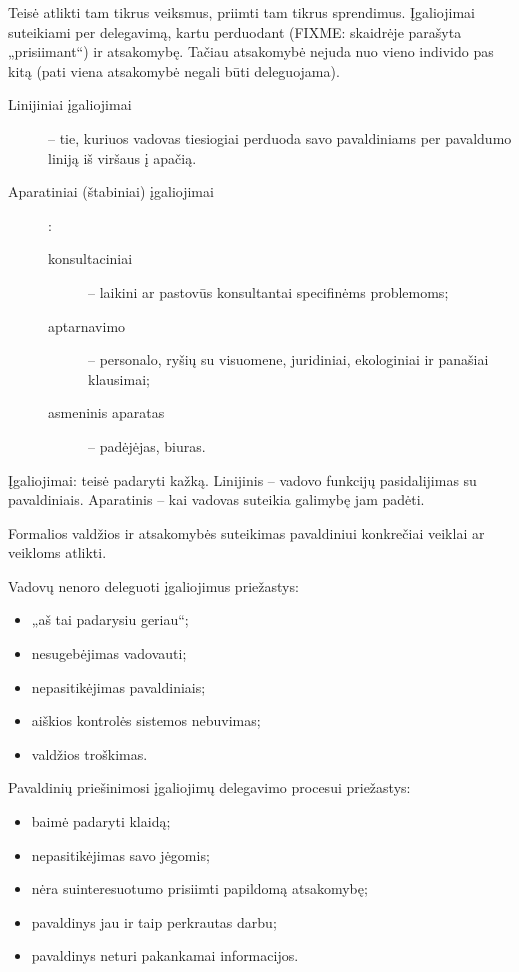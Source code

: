 \begin{defn}[Įgaliojimai]
  Teisė atlikti tam tikrus veiksmus, priimti tam tikrus sprendimus.
  Įgaliojimai suteikiami per delegavimą, kartu perduodant (FIXME:
  skaidrėje parašyta „prisiimant“) ir atsakomybę. Tačiau atsakomybė
  nejuda nuo vieno individo pas kitą (pati viena atsakomybė negali
  būti deleguojama).

  \begin{description}
    \item[Linijiniai įgaliojimai] – tie, kuriuos vadovas tiesiogiai
      perduoda savo pavaldiniams per pavaldumo liniją iš viršaus į
      apačią.
    \item[Aparatiniai (štabiniai) įgaliojimai]:
      \begin{description}
        \item[konsultaciniai] – laikini ar pastovūs konsultantai
          specifinėms problemoms;
        \item[aptarnavimo] – personalo, ryšių su visuomene, juridiniai,
          ekologiniai ir panašiai klausimai;
        \item[asmeninis aparatas] – padėjėjas, biuras.
      \end{description}
  \end{description}
\end{defn}

Įgaliojimai: teisė padaryti kažką. Linijinis – vadovo funkcijų 
pasidalijimas su pavaldiniais. Aparatinis – kai vadovas suteikia
galimybę jam padėti.

\begin{defn}[Delegavimas]
  Formalios valdžios ir atsakomybės suteikimas pavaldiniui konkrečiai
  veiklai ar veikloms atlikti.
\end{defn}

Vadovų nenoro deleguoti įgaliojimus priežastys:
\begin{itemize}
  \item „aš tai padarysiu geriau“;
  \item nesugebėjimas vadovauti;
  \item nepasitikėjimas pavaldiniais;
  \item aiškios kontrolės sistemos nebuvimas;
  \item valdžios troškimas.
\end{itemize}

Pavaldinių priešinimosi įgaliojimų delegavimo procesui priežastys:
\begin{itemize}
  \item baimė padaryti klaidą;
  \item nepasitikėjimas savo jėgomis;
  \item nėra suinteresuotumo prisiimti papildomą atsakomybę;
  \item pavaldinys jau ir taip perkrautas darbu;
  \item pavaldinys neturi pakankamai informacijos.
\end{itemize}

